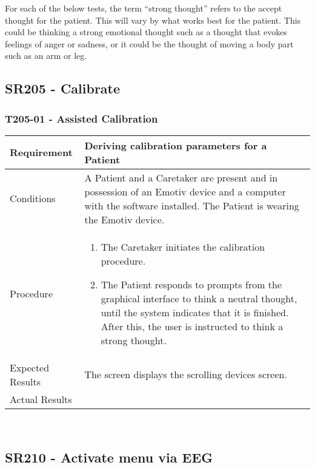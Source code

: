 \documentclass{article}
\begin{document}
For each of the below tests, the term ``strong thought'' refers to the accept thought for the patient. This will vary by what works best for the patient. This could be thinking a strong emotional thought such as a thought that evokes feelings of anger or sadness, or it could be the thought of moving a body part such as an arm or leg.

\subsection{SR205 - Calibrate}
\subsubsection{T205-01 - Assisted Calibration}
\begin{tabular}{| l | p{12cm} |}
    \hline
	Requirement & Deriving calibration parameters for a Patient \\ \hline
	Conditions & A Patient and a Caretaker are present and in possession of an
	Emotiv device and a computer with the software installed. The Patient is
	wearing the Emotiv device. \\ \hline
    Procedure &
\begin{enumerate}
    \item The Caretaker initiates the calibration procedure.
    \item The Patient responds to prompts from the graphical interface to
        think a neutral thought, until the system indicates that it is
        finished. After this, the user is instructed to think a strong thought.
\end{enumerate} \\ \hline
	Expected Results & The screen displays the scrolling devices screen. \\ \hline
Actual Results & \vspace{1cm} \\ \hline
\end{tabular}

\hfill \\

\subsection{SR210 - Activate menu via EEG}
\end{document}
